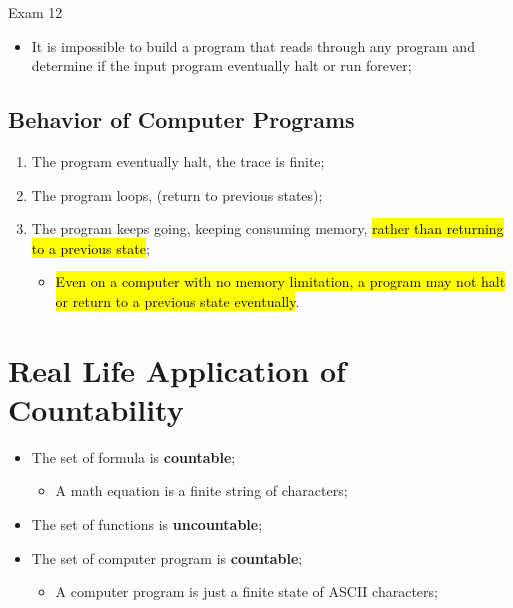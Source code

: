 \documentclass{note}
\begin{document}
\begin{note}{Exam 12}
\begin{itemize}
    \item It is impossible to build a program that reads through any program and determine if the input program eventually halt or 
    run forever;
    
\end{itemize}

    \subsection{Behavior of Computer Programs}
    
    \begin{enumerate}
        \item The program eventually halt, the trace is finite;
        \item The program loops, (return to previous states);
        \item The program keeps going, keeping consuming memory, \hl{rather than returning to a previous state};
        \begin{itemize}
            \item \hl{Even on a computer with no memory limitation, a program may not halt or return to a previous state eventually}.
        \end{itemize}
    \end{enumerate}

\section{Real Life Application of Countability}

\begin{itemize}
    \item The set of formula is \textbf{countable};
    \begin{itemize}
        \item A math equation is a finite string of characters;
    \end{itemize}
    
    \item The set of functions is \textbf{uncountable};
    
    \item The set of computer program is \textbf{countable};
    \begin{itemize}
        \item A computer program is just a finite state of ASCII characters;
    \end{itemize}
\end{itemize}

\end{note}
\end{document}
